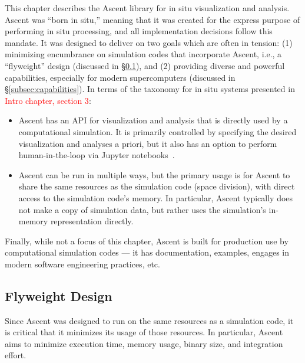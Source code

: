 \documentclass[graybox]{svmult}
\newenvironment{tightItemize}{
        \begin{itemize}
                \setlength{\itemsep}{1pt}
                \setlength{\parskip}{0pt}
                \setlength{\parsep}{0pt}
        }{\end{itemize}
}
\newcommand{\fix}[1]{\textcolor{red}{#1}} %
\begin{document}
This chapter describes the Ascent library for in situ visualization
and analysis.
%
Ascent was ``born in situ,'' meaning that it was created for the
express purpose of performing in situ processing, and all implementation
decisions follow this mandate.
%
It was designed to deliver on two goals which are often in tension:
 (1) minimizing encumbrance on simulation codes that incorporate Ascent,
i.e., a ``flyweight'' design (discussed in \S\ref{sec:flyweight}), and
(2) providing diverse and powerful capabilities,
especially for modern supercomputers (discussed in \S\ref{subsec:capabilities}).
%
In terms of the taxonomy for in situ systems presented in \fix{Intro chapter, section 3}:
\begin{tightItemize}
\item Ascent has an API for visualization and analysis that is directly
used by a computational simulation.  It is primarily controlled by
specifying the desired visualization and analyses a priori, but it
also has an option to perform human-in-the-loop via Jupyter notebooks~\cite{CyrusISAV}.
\item Ascent can be run in multiple ways, but the primary usage is for
Ascent to share the same resources as the simulation code (space division),
with direct access to the simulation code's memory.  In particular,
Ascent typically does not make a copy of simulation data, but rather
uses the simulation's in-memory representation directly.
\end{tightItemize}
Finally,  while not a focus of this chapter, Ascent is built for production use by computational
simulation codes --- it has documentation,
examples, engages in modern software engineering practices, etc.

\subsection{Flyweight Design}
\label{sec:flyweight}

Since Ascent was designed to run on the same resources as a simulation code,
it is critical that it minimizes its usage of those resources.
%
In particular, Ascent aims to minimize
execution time, memory usage, binary size, and integration effort.
\end{document}
